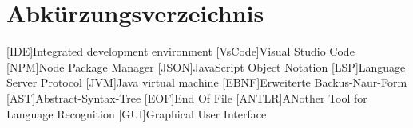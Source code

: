\chapter*{Abkürzungsverzeichnis}

\begin{acronym}[LoRaWAN]

[IDE]{Integrated development environment}
[VsCode]{Visual Studio Code}
[NPM]{Node Package Manager}
[JSON]{JavaScript Object Notation}
[LSP]{Language Server Protocol}
[JVM]{Java virtual machine}
[EBNF]{Erweiterte Backus-Naur-Form}
[AST]{Abstract-Syntax-Tree}
[EOF]{End Of File}
[ANTLR]{ANother Tool for Language Recognition}
[GUI]{Graphical User Interface}


\end{acronym}
